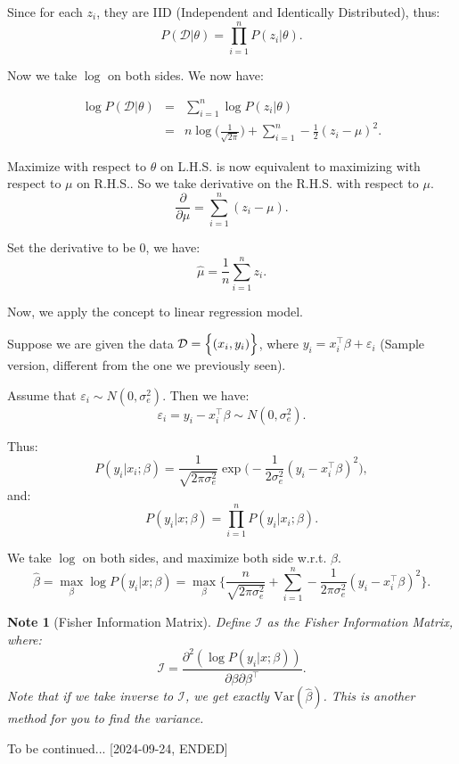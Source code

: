 \documentclass{article}
\theoremstyle{MyNonumberplain}
\theoremstyle{break}
\newcommand{\ve}{\varepsilon}
\newcommand{\var}{\text{Var}}
\newcommand{\T}{^\intercal}
\newcommand{\D}{\mathcal{D}}
\theoremstyle{break}
\newtheorem{note}{Note}
\theoremstyle{break}
\theoremstyle{break}
\begin{document}
Since for each $z_i$, they are IID (Independent and Identically Distributed), thus: 
$$P(\D|\theta)=\prod_{i=1}^n P(z_i|\theta).$$

Now we take $\log$ on both sides. We now have:

\begin{eqnarray*}
    \log P(\D|\theta)&=&\sum_{i=1}^n \log P(z_i|\theta)\\
                     &=&n\log\Biggl(\frac{1}{\sqrt{2\pi}}\Biggr) + \sum_{i=1}^n -\frac{1}{2}(z_i-\mu)^2.
\end{eqnarray*}

Maximize with respect to $\theta$ on L.H.S. is now equivalent to maximizing with respect to $\mu$ on R.H.S.. So we take derivative on the R.H.S. with respect to $\mu$.
$$\frac{\partial}{\partial\mu} =  \sum_{i=1}^n (z_i-\mu).$$

Set the derivative to be 0, we have:
$$\hat\mu=\frac{1}{n}\sum_{i=1}^n z_i.$$

Now, we apply the concept to linear regression model.

Suppose we are given the data $\D=\Bigl\{(x_i,y_i)\Bigr\}$, where $y_i=x_i\T\beta+\ve_i$ (Sample version, different from the one we previously seen).

Assume that $\ve_i\sim N(0,\sigma_e^2)$. Then we have:
$$\ve_i=y_i-x_i\T\beta\sim N(0,\sigma_e^2).$$

Thus:
$$P(y_i|x_i;\beta)=\frac{1}{\sqrt{2\pi\sigma_e^2}}\exp\Biggl(-\frac{1}{2\sigma_e^2}(y_i-x_i\T\beta)^2\Biggr),$$
and:
$$P(y_i|x;\beta)=\prod_{i=1}^{n}P(y_i|x_i;\beta).$$

We take $\log$ on both sides, and maximize both side w.r.t. $\beta$.
$$\hat\beta=\max_\beta\log P(y_i|x;\beta)=\max_\beta\Biggl\{\frac{n}{\sqrt{2\pi\sigma_e^2}} + \sum_{i=1}^{n}-\frac{1}{2\pi\sigma_e^2} (y_i-x_i\T\beta)^2\Biggr\}.$$

\begin{notebox}
    \begin{note}[Fisher Information Matrix]
        Define $\mathcal{I}$ as the Fisher Information Matrix, where: $$\mathcal{I}=\frac{\partial^2 (\log P(y_i|x;\beta))}{\partial\beta\partial\beta\T}.$$
        Note that if we take inverse to $\mathcal{I}$, we get exactly $\var(\hat\beta)$. This is another method for you to find the variance.
    \end{note}
\end{notebox}

To be continued... [2024-09-24, ENDED]
\end{document}
